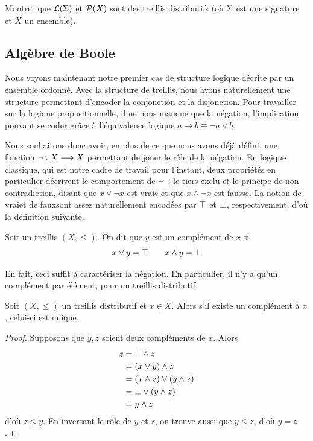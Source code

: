 \begin{exercise}
  Montrer que $\mathcal{L}(\Sigma)$ et $\mathcal{P}(X)$ sont des treillis
  distributifs (où $\Sigma$ est une signature et $X$ un ensemble).
\end{exercise}

\subsection{Algèbre de Boole}

Nous voyons maintenant notre premier cas de structure logique décrite par un
ensemble ordonné. Avec la structure de treillis, nous avons naturellement une
structure permettant d'encoder la conjonction et la disjonction. Pour travailler
sur la logique propositionnelle, il ne nous manque que la négation,
l'implication pouvant se coder grâce à l'équivalence logique
$a\to b \equiv \lnot a \lor b$.

Nous souhaitons donc avoir, en plus de ce que nous avons déjà défini, une
fonction $\lnot : \displaystyle X \longrightarrow X$ permettant de jouer le rôle de la négation.
En logique classique, qui est notre cadre de travail pour l'instant, deux
propriétés en particulier décrivent le comportement de $\lnot$~: le tiers exclu
et le principe de non contradiction, disant que $x\lor \lnot x$ est vraie et que
$x\land \lnot x$ est fausse. La notion de \og vrai\fg et de \og faux\fg sont
assez naturellement encodées par $\top$ et $\bot$, respectivement, d'où la
définition suivante.

\begin{definition}[Complément]
  Soit un treillis $(X,\leq)$. On dit que $y$ est un complément de $x$ si
  \[x\vee y = \top \qquad x \wedge y = \bot\]
\end{definition}

\noindent
En fait, ceci suffit à caractériser la négation. En particulier, il n'y a qu'un
complément par élément, pour un treillis distributif.

\begin{proposition}
  Soit $(X,\leq)$ un treillis distributif et $x\in X$. Alors s'il existe un
  complément à $x$, celui-ci est unique.
\end{proposition}

\begin{proof}
  Supposons que $y,z$ soient deux compléments de $x$. Alors
  \begin{align*}
    z &= \top \wedge z\\
    &= (x \vee y) \wedge z\\
    &= (x \wedge z) \vee (y \wedge z)\\
    &= \bot \vee (y \wedge z)\\
    &= y \wedge z
  \end{align*}
  d'où $z\leq y$. En inversant le rôle de $y$ et $z$, on trouve aussi que
  $y\leq z$, d'où $y = z$.
\end{proof}

